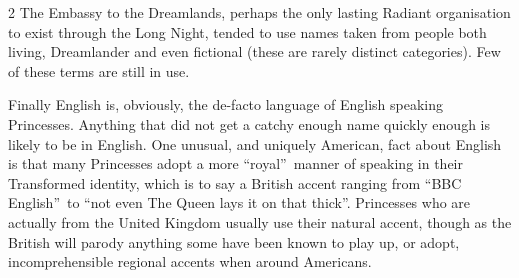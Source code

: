 \begin{multicols}{2}
The Embassy to the Dreamlands, perhaps the only lasting Radiant organisation to exist through the Long Night, tended to use names taken from people both living, Dreamlander and even fictional (these are rarely distinct categories). Few of these terms are still in use. 

Finally English is, obviously, the de-facto language of English speaking Princesses. Anything that did not get a catchy enough name quickly enough is likely to be in English. One unusual, and uniquely American, fact about English is that many Princesses adopt a more \textquotedblleft royal\textquotedblright\, manner of speaking in their Transformed identity, which is to say a British accent ranging from \textquotedblleft BBC English\textquotedblright\ to \textquotedblleft not even The Queen lays it on that thick\textquotedblright. Princesses who are actually from the United Kingdom usually use their natural accent, though as the British will parody anything some have been known to play up, or adopt, incomprehensible regional accents when around Americans. 





\end{multicols}
